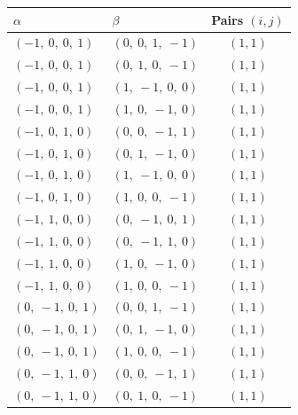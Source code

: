 \documentclass[11pt]{article}
\theoremstyle{definition}
\begin{document}
\begin{tabular}{|l|l|c|}
    \hline
    $\alpha$ & $\beta$ & Pairs $(i,j)$ \\
    \hline
    $\left( -1, \  0, \  0, \  1\right)$ & $\left( 0, \  0, \  1, \  -1\right)$ & $(1,1)$ \\
    \hline
    $\left( -1, \  0, \  0, \  1\right)$ & $\left( 0, \  1, \  0, \  -1\right)$ & $(1,1)$ \\
    \hline
    $\left( -1, \  0, \  0, \  1\right)$ & $\left( 1, \  -1, \  0, \  0\right)$ & $(1,1)$ \\
    \hline
    $\left( -1, \  0, \  0, \  1\right)$ & $\left( 1, \  0, \  -1, \  0\right)$ & $(1,1)$ \\
    \hline
    $\left( -1, \  0, \  1, \  0\right)$ & $\left( 0, \  0, \  -1, \  1\right)$ & $(1,1)$ \\
    \hline
    $\left( -1, \  0, \  1, \  0\right)$ & $\left( 0, \  1, \  -1, \  0\right)$ & $(1,1)$ \\
    \hline
    $\left( -1, \  0, \  1, \  0\right)$ & $\left( 1, \  -1, \  0, \  0\right)$ & $(1,1)$ \\
    \hline
    $\left( -1, \  0, \  1, \  0\right)$ & $\left( 1, \  0, \  0, \  -1\right)$ & $(1,1)$ \\
    \hline
    $\left( -1, \  1, \  0, \  0\right)$ & $\left( 0, \  -1, \  0, \  1\right)$ & $(1,1)$ \\
    \hline
    $\left( -1, \  1, \  0, \  0\right)$ & $\left( 0, \  -1, \  1, \  0\right)$ & $(1,1)$ \\
    \hline
    $\left( -1, \  1, \  0, \  0\right)$ & $\left( 1, \  0, \  -1, \  0\right)$ & $(1,1)$ \\
    \hline
    $\left( -1, \  1, \  0, \  0\right)$ & $\left( 1, \  0, \  0, \  -1\right)$ & $(1,1)$ \\
    \hline
    $\left( 0, \  -1, \  0, \  1\right)$ & $\left( 0, \  0, \  1, \  -1\right)$ & $(1,1)$ \\
    \hline
    $\left( 0, \  -1, \  0, \  1\right)$ & $\left( 0, \  1, \  -1, \  0\right)$ & $(1,1)$ \\
    \hline
    $\left( 0, \  -1, \  0, \  1\right)$ & $\left( 1, \  0, \  0, \  -1\right)$ & $(1,1)$ \\
    \hline
    $\left( 0, \  -1, \  1, \  0\right)$ & $\left( 0, \  0, \  -1, \  1\right)$ & $(1,1)$ \\
    \hline
    $\left( 0, \  -1, \  1, \  0\right)$ & $\left( 0, \  1, \  0, \  -1\right)$ & $(1,1)$ \\

\end{tabular}
\end{document}
